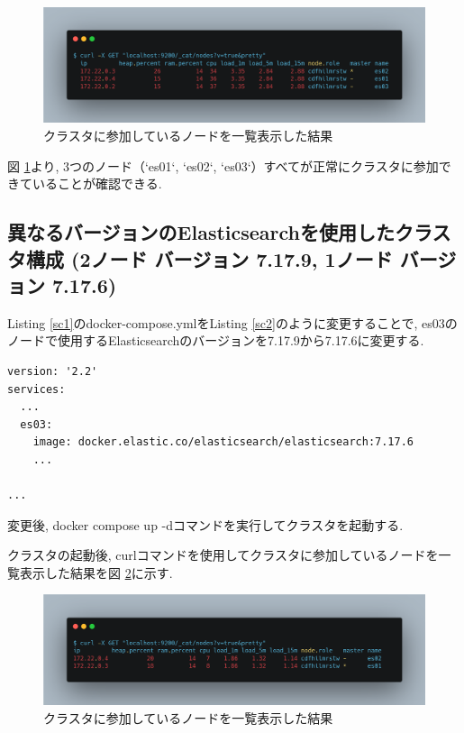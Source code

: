 \documentclass[a4j,12pt,]{jarticle}
\begin{document}
\begin{figure}[H]
  \begin{center}
    \includegraphics[width=160mm]{curl-same.png}
    \caption{クラスタに参加しているノードを一覧表示した結果}
    \label{p1}
  \end{center}
\end{figure}

図 \ref{p1}より, 3つのノード（`es01`, `es02`, `es03`）すべてが正常にクラスタに参加できていることが確認できる.

\subsection{異なるバージョンのElasticsearchを使用したクラスタ構成 (2ノード バージョン 7.17.9, 1ノード バージョン 7.17.6)}

Listing \ref{sc1}のdocker-compose.ymlをListing \ref{sc2}のように変更することで, es03のノードで使用するElasticsearchのバージョンを7.17.9から7.17.6に変更する.

\begin{lstlisting}[caption=Listing \ref{sc1}のdocker-compose.ymlから変更を加えた箇所, label=sc2]
version: '2.2'
services:
  ...
  es03:
    image: docker.elastic.co/elasticsearch/elasticsearch:7.17.6
    ...

...
\end{lstlisting}

変更後, docker compose up -dコマンドを実行してクラスタを起動する.

クラスタの起動後, curlコマンドを使用してクラスタに参加しているノードを一覧表示した結果を図 \ref{p2}に示す.

\begin{figure}[H]
  \begin{center}
    \includegraphics[width=160mm]{curl-different.png}
    \caption{クラスタに参加しているノードを一覧表示した結果}
    \label{p2}
  \end{center}
\end{figure}
\end{document}
